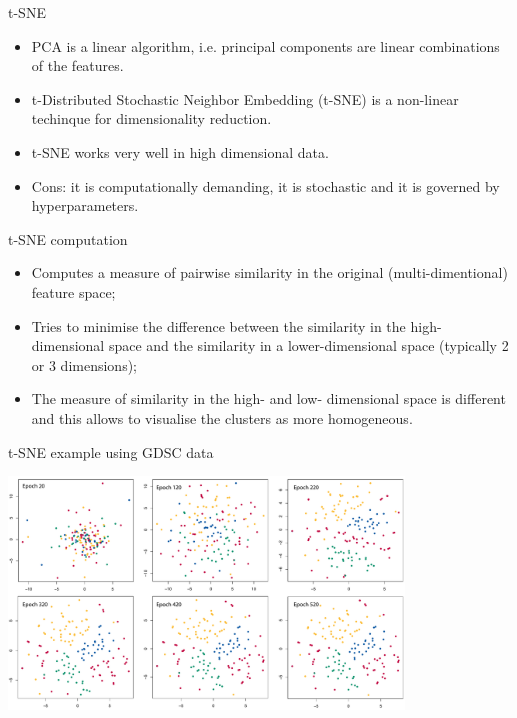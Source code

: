 \documentclass[notes]{beamer}          %
\begin{document}
\begin{frame}{t-SNE}
\begin{itemize}
	\item PCA is a linear algorithm, i.e. principal components are linear combinations of the features.
	\item t-Distributed Stochastic Neighbor Embedding (t-SNE) is a non-linear techinque for dimensionality reduction.
	\item t-SNE works very well in high dimensional data.
	\item Cons: it is computationally demanding, it is stochastic and it is governed by hyperparameters.
\end{itemize}


\end{frame}

\begin{frame}{t-SNE computation}
\begin{itemize}
	\item Computes a measure of pairwise similarity in the original (multi-dimentional) feature space;
	\item Tries to minimise the difference between the similarity in the high-dimensional space and the similarity in a lower-dimensional space (typically 2 or 3 dimensions);
	\item The measure of similarity in the high- and low- dimensional space is different and this allows to visualise the clusters as more homogeneous.
	
	
\end{itemize}
\end{frame}

\begin{frame}{t-SNE example using GDSC data}
\begin{center}
\includegraphics[height=6.2cm]{../figures/week_6/GDSC_tSNE.pdf}  
\end{center}
\end{frame}
\end{document}
